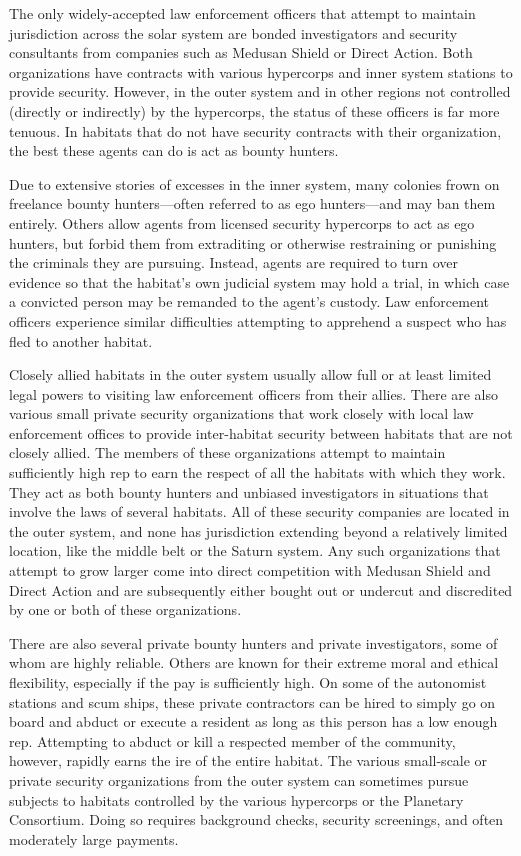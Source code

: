 The only widely-accepted law enforcement officers that attempt to maintain jurisdiction across the solar system are bonded investigators and security consultants from companies such as Medusan Shield or Direct Action. Both organizations have contracts with various hypercorps and inner system stations to provide security. However, in the outer system and in other regions not controlled (directly or indirectly) by the hypercorps, the status of these officers is far more tenuous. In habitats that do not have security contracts with their organization, the best these agents can do is act as bounty hunters. 

Due to extensive stories of excesses in the inner system, many colonies frown on freelance bounty hunters—often referred to as ego hunters—and may ban them entirely. Others allow agents from licensed security hypercorps to act as ego hunters, but forbid them from extraditing or otherwise restraining or punishing the criminals they are pursuing. Instead, agents are required to turn over evidence so that the habitat's own judicial system may hold a trial, in which case a convicted person may be remanded to the agent's custody. Law enforcement officers experience similar difficulties attempting to apprehend a suspect who has fled to another habitat. 

Closely allied habitats in the outer system usually allow full or at least limited legal powers to visiting law enforcement officers from their allies. There are also various small private security organizations that work closely with local law enforcement offices to provide inter-habitat security between habitats that are not closely allied. The members of these organizations attempt to maintain sufficiently high rep to earn the respect of all the habitats with which they work. They act as both bounty hunters and unbiased investigators in situations that involve the laws of several habitats. All of these security companies are located in the outer system, and none has jurisdiction extending beyond a relatively limited location, like the middle belt or the Saturn system. Any such organizations that attempt to grow larger come into direct competition with Medusan Shield and Direct Action and are subsequently either bought out or undercut and discredited by one or both of these organizations. 

There are also several private bounty hunters and private investigators, some of whom are highly reliable. Others are known for their extreme moral and ethical flexibility, especially if the pay is sufficiently high. On some of the autonomist stations and scum ships, these private contractors can be hired to simply go on board and abduct or execute a resident as long as this person has a low enough rep. Attempting to abduct or kill a respected member of the community, however, rapidly earns the ire of the entire habitat. The various small-scale or private security organizations from the outer system can sometimes pursue subjects to habitats controlled by the various hypercorps or the Planetary Consortium. Doing so requires background checks, security screenings, and often moderately large payments. 

